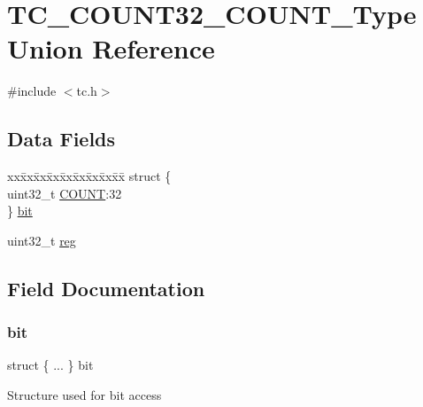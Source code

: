 \hypertarget{union_t_c___c_o_u_n_t32___c_o_u_n_t___type}{}\section{T\+C\+\_\+\+C\+O\+U\+N\+T32\+\_\+\+C\+O\+U\+N\+T\+\_\+\+Type Union Reference}
\label{union_t_c___c_o_u_n_t32___c_o_u_n_t___type}


{\ttfamily \#include $<$tc.\+h$>$}

\subsection*{Data Fields}
\begin{DoxyCompactItemize}
\item 
\begin{tabbing}
xx\=xx\=xx\=xx\=xx\=xx\=xx\=xx\=xx\=\kill
struct \{\\
\>uint32\_t \mbox{\hyperlink{union_t_c___c_o_u_n_t32___c_o_u_n_t___type_aa9f8906e3d27dfbf12691127c9bb88ba}{COUNT}}:32\\
\} \mbox{\hyperlink{union_t_c___c_o_u_n_t32___c_o_u_n_t___type_ac12a198c6dce0c0b83aa6cd955fa46d4}{bit}}\\

\end{tabbing}\item 
uint32\+\_\+t \mbox{\hyperlink{union_t_c___c_o_u_n_t32___c_o_u_n_t___type_a6b91636401516a477989a336376d7b40}{reg}}
\end{DoxyCompactItemize}


\subsection{Field Documentation}
\mbox{\label{union_t_c___c_o_u_n_t32___c_o_u_n_t___type_ac12a198c6dce0c0b83aa6cd955fa46d4}} 
\subsubsection{\texorpdfstring{bit}{bit}}
{\footnotesize\ttfamily struct \{ ... \}   bit}

Structure used for bit access \mbox{\label{union_t_c___c_o_u_n_t32___c_o_u_n_t___type_aa9f8906e3d27dfbf12691127c9bb88ba}} 
